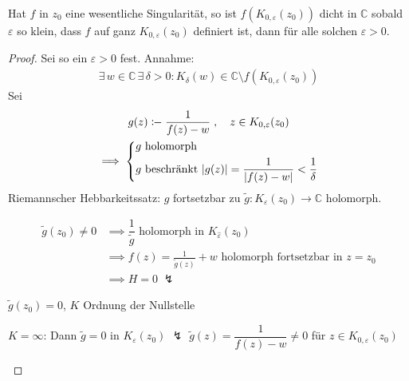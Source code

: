 \begin{theorem}
  Hat $f$ in $z_0$ eine wesentliche Singularität, so ist $f(K_{0,\varepsilon}(z_0))$ dicht in $\mathbb{C}$ sobald $\varepsilon$ so klein, dass $f$ auf ganz $K_{0,\varepsilon}(z_0)$ definiert ist, dann für alle solchen $\varepsilon > 0$.
  \begin{proof}
    Sei so ein $\varepsilon > 0$ fest. Annahme:
    \begin{align*}
      \exists \, w \in \mathbb{C} \, \exists \, \delta > 0 : K_\delta(w) \in \mathbb{C} \setminus f(K_{0,\varepsilon}(z_0))
    \end{align*}
    Sei
    \begin{gather*}
      g(z) \coloneq \frac{1}{f(z) - w} \; , \quad z \in K_{0,\varepsilon}(z_0) \\
      \implies
      \begin{dcases}
        g \text{ holomorph} \\
        g \text{ beschränkt } |g(z)| = \frac{1}{|f(z) - w|} < \frac{1}{\delta}
      \end{dcases}
    \end{gather*}
    Riemannscher Hebbarkeitssatz: $g$ fortsetzbar zu $\widetilde{g} : K_\varepsilon(z_0) \to \mathbb{C}$ holomorph.
    
    
    \begin{align*}
      \widetilde{g}(z_0) \neq 0
      &\implies \dfrac{1}{\widetilde{g}} \text{ holomorph in } K_{\widehat{\varepsilon}}(z_0) \\
      &\implies f(z) = \frac{1}{\widetilde{g}(z)} + w \text{ holomorph fortsetzbar in } z = z_0 \\
      &\implies H = 0 \; \lightning
    \end{align*}
    
    
    $\widetilde{g}(z_0) = 0$, $K$ Ordnung der Nullstelle
    
    \begin{enum-alph}
      \item $K = \infty$: Dann $\widetilde{g} = 0$ in $K_\varepsilon(z_0)$ $\lightning$ $\widetilde{g}(z)=\dfrac{1}{f(z)-w} \neq 0$ für $z \in K_{0,\varepsilon}(z_0)$
      

\end{enum-alph}
\end{proof}
\end{theorem}
